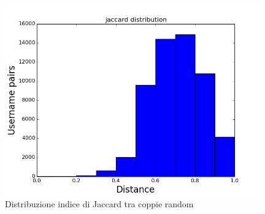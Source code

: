 \begin{figure}[bp!]
\centering
\includegraphics[width=110mm]{chapters/distanceplot/random_jaccard_distribution.png}
\caption{Distribuzione indice di Jaccard tra coppie random \label{overflow}}
\end{figure}
